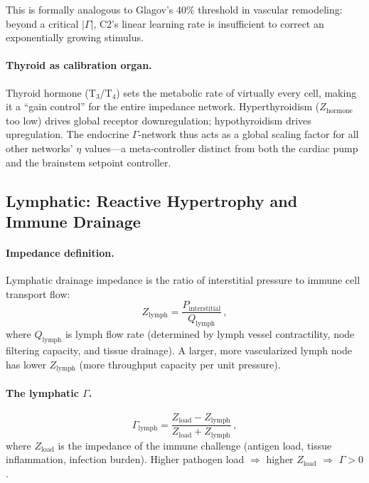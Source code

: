 \documentclass[aps,pre,twocolumn,superscriptaddress,floatfix]{revtex4-2}
\begin{document}
This is formally analogous to Glagov's 40\%
threshold in vascular remodeling: beyond a
critical $|\Gamma|$, C2's linear learning rate
is insufficient to correct an exponentially
growing stimulus.

\paragraph{Thyroid as calibration organ.}
Thyroid hormone (T$_3$/T$_4$) sets the metabolic
rate of virtually every cell, making it a
``gain control'' for the entire impedance network.
Hyperthyroidism ($Z_{\text{hormone}}$ too low)
drives global receptor downregulation;
hypothyroidism drives upregulation.
The endocrine $\Gamma$-network thus acts as a
global scaling factor for all other networks'
$\eta$ values---a meta-controller
distinct from both the cardiac pump
and the brainstem setpoint controller.


\subsection{Lymphatic: Reactive Hypertrophy and Immune Drainage}
\label{sec:lymphatic}

\paragraph{Impedance definition.}
Lymphatic drainage impedance is the ratio of
interstitial pressure to immune cell transport
flow:
\begin{equation}
  Z_{\text{lymph}} =
  \frac{P_{\text{interstitial}}}{Q_{\text{lymph}}}\,,
  \label{eq:z-lymph}
\end{equation}
where $Q_{\text{lymph}}$ is lymph flow rate
(determined by lymph vessel contractility,
node filtering capacity, and tissue drainage).
A larger, more vascularized lymph node has
lower $Z_{\text{lymph}}$ (more throughput
capacity per unit pressure).

\paragraph{The lymphatic $\Gamma$.}
\begin{equation}
  \Gamma_{\text{lymph}} =
  \frac{Z_{\text{load}} - Z_{\text{lymph}}}
       {Z_{\text{load}} + Z_{\text{lymph}}}\,,
  \label{eq:gamma-lymph}
\end{equation}
where $Z_{\text{load}}$ is the impedance of
the immune challenge (antigen load, tissue
inflammation, infection burden).
Higher pathogen load $\Rightarrow$ higher
$Z_{\text{load}}$ $\Rightarrow$ $\Gamma > 0$.
\end{document}
